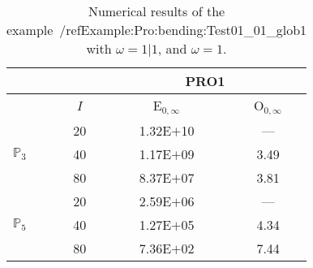 \begin{table}[H]
\caption{Numerical results of the example~/ref{Example:Pro:bending:Test01_01_glob1} with $\omega=1|1$, and $\omega=1$.}
\setlength{\tabcolsep}{5pt}
\centering
\begin{tabular}{@{}l c c c@{}}
\toprule
 &  & \multicolumn{2}{c}{PRO1}\\
\midrule
 & $I$ & E$_{0,\infty}$ & O$_{0,\infty}$\\
\midrule
\multirow{3}{*}{$\mathbb{P}_{3}$}
 & 20 & 1.32E$+$10 & ---\\
 & 40 & 1.17E$+$09 & 3.49\\
 & 80 & 8.37E$+$07 & 3.81\\
\midrule
\multirow{3}{*}{$\mathbb{P}_{5}$}
 & 20 & 2.59E$+$06 & ---\\
 & 40 & 1.27E$+$05 & 4.34\\
 & 80 & 7.36E$+$02 & 7.44\\
\bottomrule
\end{tabular}
\label{Table:PRO:test_01_01_test1_pro1}
\end{table}
